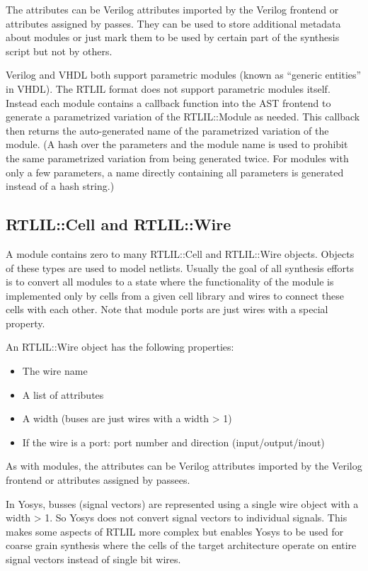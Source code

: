 The attributes can be Verilog attributes imported by the Verilog frontend or attributes assigned
by passes. They can be used to store additional metadata about modules or just mark them to be
used by certain part of the synthesis script but not by others.

Verilog and VHDL both support parametric modules (known as ``generic entities'' in VHDL). The RTLIL
format does not support parametric modules itself. Instead each module contains a callback function
into the AST frontend to generate a parametrized variation of the RTLIL::Module as needed. This
callback then returns the auto-generated name of the parametrized variation of the module. (A hash
over the parameters and the module name is used to prohibit the same parametrized variation from being
generated twice. For modules with only a few parameters, a name directly containing all parameters
is generated instead of a hash string.)

\subsection{RTLIL::Cell and RTLIL::Wire}

A module contains zero to many RTLIL::Cell and RTLIL::Wire objects. Objects of
these types are used to model netlists. Usually the goal of all synthesis efforts is to convert
all modules to a state where the functionality of the module is implemented only by cells
from a given cell library and wires to connect these cells with each other. Note that module
ports are just wires with a special property.

An RTLIL::Wire object has the following properties:

\begin{itemize}
\item The wire name
\item A list of attributes
\item A width (buses are just wires with a width > 1)
\item If the wire is a port: port number and direction (input/output/inout)
\end{itemize}

As with modules, the attributes can be Verilog attributes imported by the
Verilog frontend or attributes assigned by passees.

In Yosys, busses (signal vectors) are represented using a single wire object
with a width > 1. So Yosys does not convert signal vectors to individual signals.
This makes some aspects of RTLIL more complex but enables Yosys to be used for
coarse grain synthesis where the cells of the target architecture operate on
entire signal vectors instead of single bit wires.


